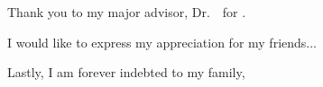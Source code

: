 
Thank you to my major advisor, Dr.\ \majoradvisor ~for \blindtext.

I would like to express my appreciation for my friends...\blindtext

Lastly, I am forever indebted to my family, \blindtext